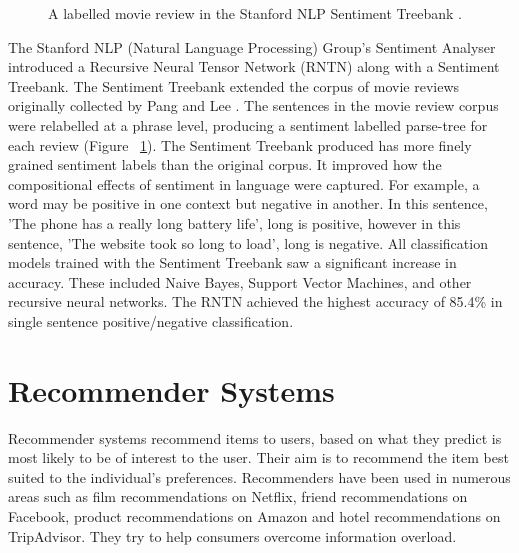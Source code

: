 \begin{figure}[h!]
\centering
{}
\caption{\label{fig:treebank} A labelled movie review in the Stanford NLP Sentiment Treebank \cite{stanfordSentiment2013}.}
\end{figure}

The Stanford NLP (Natural Language Processing) Group's Sentiment Analyser \cite{stanfordSentiment2013} introduced a Recursive Neural Tensor Network (RNTN) along with a Sentiment Treebank. The Sentiment Treebank extended the corpus of movie reviews originally collected by Pang and Lee \cite{panglee2004}. The sentences in the movie review corpus were relabelled at a phrase level, producing a sentiment labelled parse-tree for each review (Figure ~\ref{fig:treebank}). The Sentiment Treebank produced has more finely grained sentiment labels than the original corpus. It improved how the compositional effects of sentiment in language were captured. For example, a word may be positive in one context but negative in another. In this sentence, 'The phone has a really long battery life', long is positive, however in this sentence, 'The website took so long to load', long is negative. All classification models trained with the Sentiment Treebank saw a significant increase in accuracy. These included Naive Bayes, Support Vector Machines, and other recursive neural networks. The RNTN achieved the highest accuracy of 85.4\% in single sentence positive/negative classification.

\section{Recommender Systems}

Recommender systems recommend items to users, based on what they predict is most likely to be of interest to the user. Their aim is to recommend the item best suited to the individual's preferences. Recommenders have been used in numerous areas such as film recommendations on Netflix, friend recommendations on Facebook, product recommendations on Amazon and hotel recommendations on TripAdvisor. They try to help consumers overcome information overload.

